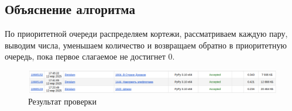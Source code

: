 \documentclass[a4paper,12pt]{article}
\begin{document}
\subsection*{Объяснение алгоритма}
По приоритетной очереди распределяем кортежи, рассматриваем каждую пару, выводим числа, уменьшаем количество и возвращаем обратно в приоритетную очередь, пока первое слагаемое не достигнет 0.

\begin{figure}[H]
    \centering
    \includegraphics[width=1\textwidth]{check_1.png}
    \caption{Результат проверки}
    \label{fig:compiler-status}
\end{figure}
\end{document}
